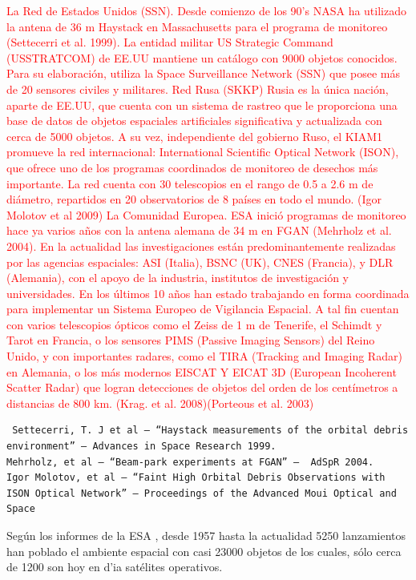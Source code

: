 \textcolor{red}{La Red de Estados Unidos (SSN).
Desde comienzo de los 90's NASA ha utilizado la antena de 36 m Haystack en Massachusetts para el programa de monitoreo (Settecerri et al. 1999).
La entidad militar US Strategic Command (USSTRATCOM) de EE.UU mantiene un catálogo con 9000 objetos conocidos. Para su elaboración, utiliza la Space Surveillance Network (SSN) que posee más de 20 sensores civiles y militares.
Red Rusa (SKKP)
Rusia es la única nación, aparte de EE.UU, que cuenta con un sistema de rastreo que le proporciona una base de datos de objetos espaciales artificiales significativa y actualizada con cerca de 5000 objetos.
A su vez, independiente del gobierno Ruso, el KIAM1 promueve la red internacional: International Scientific Optical Network (ISON), que ofrece uno de los programas coordinados de monitoreo de desechos más importante.
La red cuenta con 30 telescopios en el rango de 0.5 a 2.6 m de diámetro, repartidos en 20 observatorios de 8 países en todo el mundo. (Igor Molotov et al 2009)
La Comunidad Europea.
ESA inició programas de monitoreo hace ya varios años con la antena alemana de 34 m en FGAN (Mehrholz et al. 2004).
En la actualidad las investigaciones están predominantemente realizadas por las agencias espaciales: ASI (Italia), BSNC (UK), CNES (Francia), y DLR (Alemania), con el apoyo de la industria, institutos de investigación y universidades. En los últimos 10 años han estado trabajando en forma coordinada para implementar un Sistema Europeo de Vigilancia Espacial.
A tal fin cuentan con varios telescopios ópticos como el Zeiss de 1 m de Tenerife, el Schimdt y Tarot en Francia, o los sensores PIMS (Passive Imaging Sensors) del Reino Unido, y con importantes radares, como el TIRA (Tracking and Imaging Radar) en Alemania, o los más modernos EISCAT Y EICAT 3D (European Incoherent Scatter Radar) que logran detecciones de objetos del orden de los centímetros a distancias de 800 km. (Krag. et al. 2008)(Porteous et al. 2003)}


\begin{verbatim}
 Settecerri, T. J et al – “Haystack measurements of the orbital debris environment” – Advances in Space Research 1999.
Mehrholz, et al – “Beam-park experiments at FGAN” –  AdSpR 2004.
Igor Molotov, et al – “Faint High Orbital Debris Observations with ISON Optical Network” – Proceedings of the Advanced Moui Optical and Space
\end{verbatim}


Seg\'un los informes de la \ac{ESA} \citep{esaSD}, desde 1957 hasta la actualidad 5250 lanzamientos han poblado el ambiente espacial con casi 23000 objetos de los cuales, s\'olo cerca de 1200 son hoy en d'ia sat\'elites operativos.\\

